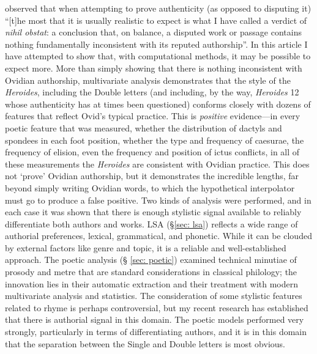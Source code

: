 \documentclass[twocolumn, switch, a4paper]{article} %
\begin{document}
 observed that when attempting to prove authenticity
 (as opposed to disputing it) ``[t]he most that it is usually realistic to
 expect is what I have called a verdict of \emph{nihil obstat}: a conclusion
 that, on balance, a disputed work or passage contains nothing fundamentally
 inconsistent with its reputed authorship''. In this article I have attempted
 to show that, with computational methods, it may be possible to expect more.
 More than simply showing that there is nothing inconsistent with Ovidian
 authorship, multivariate analysis demonstrates that the style of the
 \emph{Heroides}, including the Double letters (and including, by the way,
 \emph{Heroides} 12 whose authenticity has at times been questioned) conforms
 closely with dozens of features that reflect Ovid's typical practice. This is
 \emph{positive} evidence---in every poetic feature that was measured, whether
 the distribution of dactyls and spondees in each foot position, whether the
 type and frequency of caesurae, the frequency of elision, even the frequency
 and position of ictus conflicts, in all of these measurements the
 \emph{Heroides} are consistent with Ovidian practice. This does not `prove'
 Ovidian authorship, but it demonstrates the incredible lengths, far beyond
 simply writing Ovidian words, to which the hypothetical interpolator must go
 to produce a false positive. Two kinds of analysis were performed, and in
 each case it was shown that there is enough stylistic signal available to
 reliably differentiate both authors and works. LSA (\S \ref{sec: lsa})
 reflects a wide range of authorial preferences, lexical, grammatical, and
 phonetic. While it can be clouded by external factors like genre and topic,
 it is a reliable and well-established approach. The poetic analysis (\S
 \ref{sec: poetic}) examined technical minutiae of prosody and metre that are
 standard considerations in classical philology; the innovation lies in their
 automatic extraction and their treatment with modern multivariate analysis
 and statistics. The consideration of some stylistic features related to rhyme
 is perhaps controversial, but my recent research \cite{nagy_rhyme_2022} has
 established that there is authorial signal in this domain. The poetic models
 performed very strongly, particularly in terms of differentiating authors,
 and it is in this domain that the separation between the Single and Double
 letters is most obvious.
\end{document}

